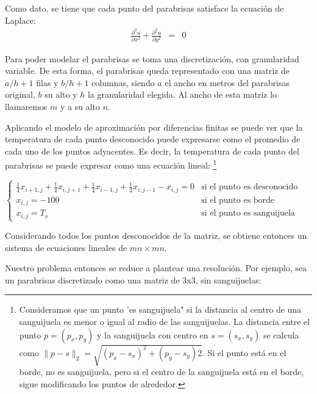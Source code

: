 \documentclass[a4paper]{article}
\begin{document}
Como dato, se tiene que cada punto del parabrisas satisface la ecuación de Laplace:
\begin{eqnarray*}
\frac{\partial ^2u}{\partial x^2}+\frac{\partial ^2u}{\partial y^2}&=&0
\end{eqnarray*}



Para poder modelar el parabrisas se toma una discretización, con granularidad variable. De esta forma, el parabrisas queda representado con una matriz de $a/h+1$ filas y $b/h+1$ columnas, siendo $a$ el ancho en metros del parabrisas original, $b$ su alto y $h$ la granularidad elegida. Al ancho de esta matriz lo llamaremos $m$ y a su alto $n$. 

Aplicando el modelo de aproximación por diferencias finitas se puede ver que la temperatura de cada punto desconocido puede expresarse como el promedio de cada uno de los puntos adyacentes. Es decir, la temperatura de cada punto del parabrisas se puede expresar como una ecuación lineal: \footnote{Consideramos que un punto 'es sanguijuela" si la distancia al centro de una sanguijuela es menor o igual al radio de las sanguijuelas. La distancia entre el punto $p=(p_x, p_y)$ y la sanguijuela con centro en $s=(s_x, s_y)$ se calcula como $\| p-s  \|_{2}= \sqrt{(p_x-s_x)^2+(p_y-s_y)2}$. Si el punto está en el borde, no es sanguijuela, pero si el centro de la sanguijuela está en el borde, sigue modificando los puntos de alrededor.} \newline 

$\left \{\begin{array}{ll}
\frac{1}{4}x_{i+1,j}+\frac{1}{4}x_{i,j+1}+\frac{1}{4}x_{i-1,j}+\frac{1}{4}x_{i,j-1}-x_{i,j}=0 & \text{si el punto es desconocido} \\  x_{i,j}=-100 & \text{si el punto es borde} \\ x_{i,j}=T_s & \text{si el punto es sanguijuela} \end{array}$ \newline

Considerando todos los puntos desconocidos de la matriz, se obtiene entonces un sistema de ecuaciones lineales de $mn \times mn$.

Nuestro problema entonces se reduce a plantear una resolución.
Por ejemplo, sea un parabrisas discretizado como una matriz de 3x3, sin sanguijuelas: \newline \newline
\end{document}

